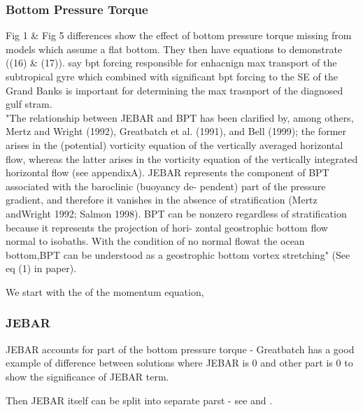 \documentclass[..\EOYR.tex]{subfiles}
\begin{document}
\subsubsection*{Bottom Pressure Torque}
\citep{Greatbatch1991} Fig 1 \& Fig 5 differences show the effect of bottom pressure torque missing from models which assume a flat bottom. They then have equations to demonstrate ((16) \& (17)). \citep{Greatbatch1991} say bpt forcing responsible for enhacnign max transport of the subtropical gyre which combined with significant bpt forcing to the SE of the Grand Banks is important for determining the max trasnport of the diagnosed gulf stram. \\
\citep{Yeager2015} "The relationship between JEBAR and BPT has been clarified by, among others, Mertz and Wright (1992), Greatbatch et al. (1991), and Bell (1999); the former arises in the (potential) vorticity equation of the vertically averaged horizontal flow, whereas the latter arises in the vorticity equation of the vertically integrated horizontal flow (see appendixA). JEBAR represents the component of BPT associated with the baroclinic (buoyancy de- pendent) part of the pressure gradient, and therefore it vanishes in the absence of stratification (Mertz andWright 1992; Salmon 1998). BPT can be nonzero regardless of stratification because it represents the projection of hori- zontal geostrophic bottom flow normal to isobaths. With the condition of no normal flowat the ocean bottom,BPT can be understood as a geostrophic bottom vortex stretching" (See eq (1) in paper).

We start with the  of the momentum equation,
\begin{equation}\label{momentum}
\end{equation}

\subsubsection*{JEBAR}
\citep{Greatbatch1991} JEBAR accounts for part of the bottom pressure torque - Greatbatch has a good example of difference between solutions where JEBAR is 0 and other part is 0 to show the significance of JEBAR term.

Then JEBAR itself can be split into separate parst - see \citep{Greatbatch1991} and \citep{Gula2014}.\\
\end{document}
